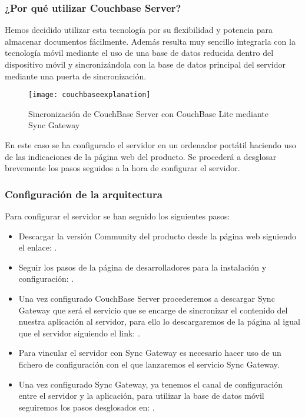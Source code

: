\subsubsection{¿Por qué utilizar Couchbase Server?}

Hemos decidido utilizar esta tecnología por su flexibilidad y potencia para almacenar documentos fácilmente. Además resulta muy sencillo integrarla con la tecnología móvil mediante el uso de una base de datos reducida dentro del dispositivo móvil y sincronizándola con la base de datos principal del servidor mediante una puerta de sincronización.

\begin{figure}[H]
	\centering
	\texttt{[image: couchbaseexplanation]}
	\caption{Sincronización de CouchBase Server con CouchBase Lite mediante Sync Gateway}
	\label{fig:couchbaseexplanation}
\end{figure}

En este caso se ha configurado el servidor en un ordenador portátil haciendo uso de las indicaciones de la página web del producto. Se procederá a desglosar brevemente los pasos seguidos a la hora de configurar el servidor.


\subsubsection{Configuración de la arquitectura}

Para configurar el servidor se han seguido los siguientes pasos: 


\begin{itemize}
\item Descargar la versión Community del producto desde la página web siguiendo el enlace: \cite{URL::couchbaseDownload}. 
\item Seguir los pasos de la página de desarrolladores para la instalación y configuración: \cite{URL::couchBaseGuide}. 
\item Una vez configurado CouchBase Server procederemos a descargar Sync Gateway que será el servicio que se encarge de sincronizar el contenido del nuestra aplicación al servidor, para ello lo descargaremos de la página al igual que el servidor siguiendo el link: \cite{URL::couchbaseDownload} .
\item Para vincular el servidor con Sync Gateway es necesario hacer uso de un fichero de configuración con el que lanzaremos el servicio Sync Gateway.
\item Una vez configurado Sync Gateway, ya tenemos el canal de configuración entre el servidor y la aplicación, para utilizar la base de datos móvil seguiremos los pasos desglosados en: \cite{URL::couchBaseLite} .
\end{itemize}


